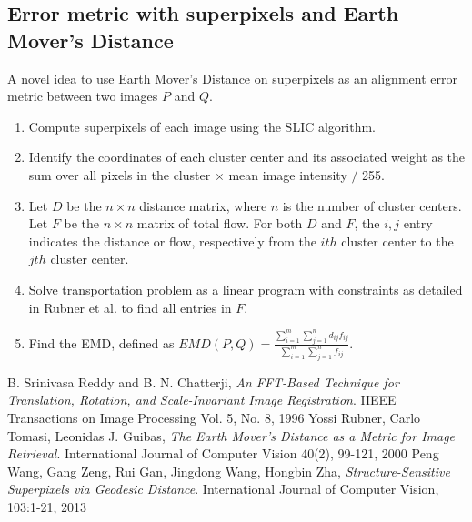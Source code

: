 \documentclass{article}
\begin{document}
\subsection{Error metric with superpixels and Earth Mover's Distance}
A novel idea to use Earth Mover's Distance on superpixels as an alignment error metric between two images $P$ and $Q$.
\begin{enumerate}
\item Compute superpixels of each image using the SLIC algorithm.
\item Identify the coordinates of each cluster center and its associated weight as the sum over all pixels in the cluster $\times$ mean image intensity $/$ 255. 
\item Let $D$ be the $n \times n$ distance matrix, where $n$ is the number of cluster centers. Let $F$ be the $n \times n$ matrix of total flow. For both $D$ and $F$, the $i,j$ entry indicates the distance or flow, respectively from the $ith$ cluster center to the $jth$ cluster center. 
\item Solve transportation problem as a linear program with constraints as detailed in Rubner et al. \cite{rubner00} to find all entries in $F$.
\item Find the EMD, defined as $EMD(P,Q) = \frac{ \sum_{i=1}^m \sum_{j=1}^n d_{ij} f_{ij} } { \sum_{i=1}^m \sum_{j=1}^n f_{ij} }$.
\end{enumerate}

\begin{thebibliography}{9}

	B. Srinivasa Reddy and B. N. Chatterji,
	\emph{An FFT-Based Technique for Translation, Rotation, and Scale-Invariant Image Registration}.
	IIEEE Transactions on Image Processing Vol. 5, No. 8, 1996
	Yossi Rubner, Carlo Tomasi, Leonidas J. Guibas,
	\emph{The Earth Mover's Distance as a Metric for Image Retrieval}.
	International Journal of Computer Vision 40(2), 99-121, 2000
	Peng Wang, Gang Zeng, Rui Gan, Jingdong Wang, Hongbin Zha,
	\emph{Structure-Sensitive Superpixels via Geodesic Distance}.
	International Journal of Computer Vision, 103:1-21, 2013

\end{thebibliography}
\end{document}

